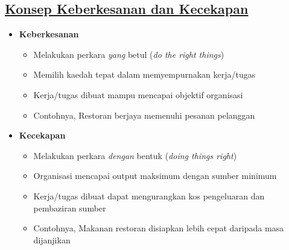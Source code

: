 \documentclass{book}
\begin{document}
\begin{multicols*}{2}
    \subsection*{\underline{Konsep Keberkesanan dan Kecekapan}}
    \begin{itemize}
      \item \textbf{Keberkesanan}
        \begin{itemize}[leftmargin=*]
          \item Melakukan perkara \emph{yang} betul (\textit{do the right things})
          \item Memilih kaedah tepat dalam memyempurnakan kerja/tugas
          \item Kerja/tugas dibuat mampu mencapai objektif organisasi
          \item Contohnya, Restoran berjaya memenuhi pesanan pelanggan
        \end{itemize}
      \item \textbf{Kecekapan}
        \begin{itemize}[leftmargin=*]
          \item Melakukan perkara \emph{dengan} bentuk (\textit{doing things right})
          \item Organisasi mencapai output maksimum dengan sumber minimum
          \item Kerja/tugas dibuat dapat mengurangkan kos pengeluaran dan pembaziran sumber
          \item Contohnya, Makanan restoran disiapkan lebih cepat daripada masa dijanjikan
        \end{itemize}
    \end{itemize}


\end{multicols*}
\end{document}
